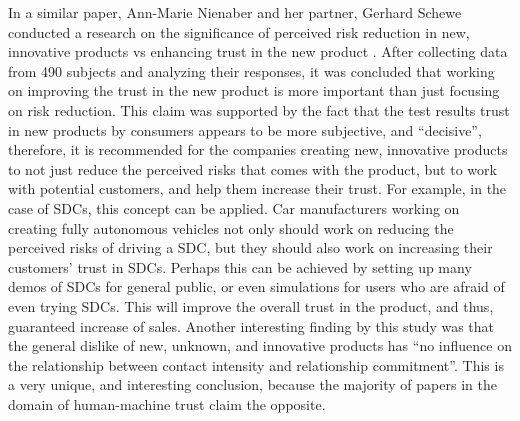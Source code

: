 \documentclass[runningheads,a4paper]{llncs}
\begin{document}
In a similar paper, Ann-Marie Nienaber and her partner, Gerhard Schewe conducted a research on the significance of perceived risk reduction in new, innovative products vs enhancing trust in the new product \cite{nienaber2014enhancing}. After collecting data from 490 subjects and analyzing their responses, it was concluded that working on improving the trust in the new product is more important than just focusing on risk reduction. This claim was supported by the fact that the test results trust in new products by consumers appears to be more subjective, and ``decisive'', therefore, it is recommended for the companies creating new, innovative products to not just reduce the perceived risks that comes with the product, but to work with potential customers, and help them increase their trust. For example, in the case of SDCs, this concept can be applied. Car manufacturers working on creating fully autonomous vehicles not only should work on reducing the perceived risks of driving a SDC, but they should also work on increasing their customers' trust in SDCs. Perhaps this can be achieved by setting up many demos of SDCs for general public, or even simulations for users who are afraid of even trying SDCs. This will improve the overall trust in the product, and thus, guaranteed increase of sales. Another interesting finding by this study was that the general dislike of new, unknown, and innovative products has ``no influence on the
relationship between contact intensity and relationship commitment''. This is a very unique, and interesting conclusion, because the majority of papers in the domain of human-machine trust claim the opposite.
\end{document}
